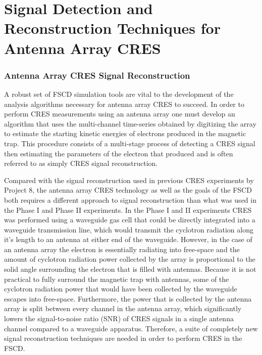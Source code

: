 \section{Signal Detection and Reconstruction Techniques for Antenna Array CRES}
\label{sec:chap4-pter}

\subsubsection*{Antenna Array CRES Signal Reconstruction}

A robust set of FSCD simulation tools are vital to the development of the analysis algorithms necessary for antenna array CRES to succeed. In order to perform CRES measurements using an antenna array one must develop an algorithm that uses the multi-channel time-series obtained by digitizing the array to estimate the starting kinetic energies of electrons produced in the magnetic trap. This procedure consists of a multi-stage process of detecting a CRES signal then estimating the parameters of the electron that produced and is often referred to as simply CRES signal reconstruction.

Compared with the signal reconstruction used in previous CRES experiments by Project 8, the antenna array CRES technology as well as the goals of the FSCD both requires a different approach to signal reconstruction than what was used in the Phase I and Phase II experiments. In the Phase I and II experiments CRES was performed using a waveguide gas cell that could be directly integrated into a waveguide transmission line, which would transmit the cyclotron radiation along it's length to an antenna at either end of the waveguide. However, in the case of an antenna array the electron is essentially radiating into free-space and the amount of cyclotron radiation power collected by the array is proportional to the solid angle surrounding the electron that is filled with antennas. Because it is not practical to fully surround the magnetic trap with antennas, some of the cyclotron radiation power that would have been collected by the waveguide escapes into free-space. Furthermore, the power that is collected by the antenna array is split between every channel in the antenna array, which significantly lowers the signal-to-noise ratio (SNR) of CRES signals in a single antenna channel compared to a waveguide apparatus. Therefore, a suite of completely new signal reconstruction techniques are needed in order to perform CRES in the FSCD.

